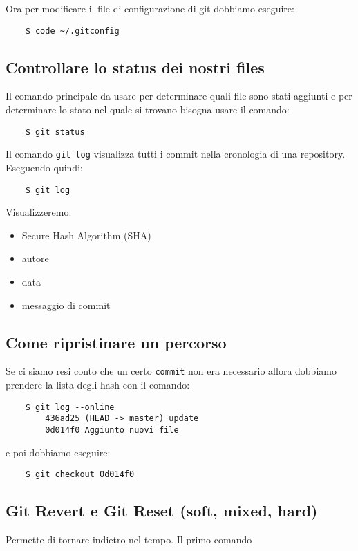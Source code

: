 \documentclass{article}
\begin{document}
Ora per modificare il file di configurazione di git dobbiamo eseguire:

\begin{verbatim}
    $ code ~/.gitconfig
\end{verbatim}


\subsection*{Controllare lo status dei nostri files}
Il comando principale da usare per determinare quali file sono stati aggiunti e per determinare lo stato nel quale si trovano bisogna usare il comando:
\begin{verbatim}
    $ git status
\end{verbatim}

Il comando \texttt{git log} visualizza tutti i commit nella cronologia di una repository. Eseguendo quindi:
\begin{verbatim}
    $ git log
\end{verbatim}
Visualizzeremo:
\begin{itemize}
    \item Secure Hash Algorithm (SHA)
    \item autore
    \item data
    \item messaggio di commit
\end{itemize}


\subsection*{Come ripristinare un percorso}
Se ci siamo resi conto che un certo \texttt{commit} non era necessario allora dobbiamo prendere la lista degli hash con il comando:
\begin{verbatim}
    $ git log --online
        436ad25 (HEAD -> master) update
        0d014f0 Aggiunto nuovi file
\end{verbatim}
e poi dobbiamo eseguire:
\begin{verbatim}
    $ git checkout 0d014f0
\end{verbatim}

\subsection*{Git Revert e Git Reset (soft, mixed, hard)}
Permette di tornare indietro nel tempo. Il primo comando 
\end{document}
